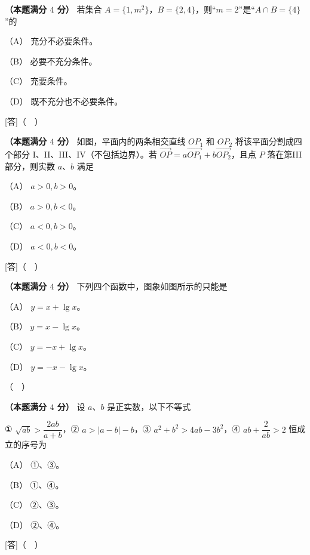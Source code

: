 \begin{question}
\textbf{（本题满分 $4$ 分）} 若集合 $A=\{1,m^2\}$，$B=\{2,4\}$，则“$m=2$”是“$A\cap B=\{4\}$”的

（A） 充分不必要条件。

（B） 必要不充分条件。

（C） 充要条件。

（D） 既不充分也不必要条件。

[答]（　）

\Needspace{0.4\textheight}
\end{question}
\begin{question}
\textbf{（本题满分 $4$ 分）} 如图，平面内的两条相交直线 $OP_1$ 和 $OP_2$ 将该平面分割成四个部分 I、II、III、IV（不包括边界）。若 $\overrightarrow{OP}=a\overrightarrow{OP_1}+b\overrightarrow{OP_2}$，且点 $P$ 落在第III部分，则实数 $a$、$b$ 满足
\nopagebreak[4]
\begin{center}\end{center}
\nopagebreak[4]
（A） $a>0,b>0$。

（B） $a>0,b<0$。

（C） $a<0,b>0$。

（D） $a<0,b<0$。

[答]（　）

\Needspace{0.4\textheight}
\end{question}
\begin{question}
\textbf{（本题满分 $4$ 分）} 下列四个函数中，图象如图所示的只能是

（A） $y=x+\lg x$。

（B） $y=x-\lg x$。

（C） $y=-x+\lg x$。

（D） $y=-x-\lg x$。
\nopagebreak[4]
\begin{center}\end{center}
\nopagebreak[4]
[答]（　）

\end{question}
\begin{question}
\textbf{（本题满分 $4$ 分）} 设 $a$、$b$ 是正实数，以下不等式

① $\sqrt{ab}>\dfrac{2ab}{a+b}$，② $a>|a-b|-b$，③ $a^2+b^2>4ab-3b^2$，④ $ab+\dfrac2{ab}>2$ 恒成立的序号为

（A） ①、③。

（B） ①、④。

（C） ②、③。

（D） ②、④。

[答]（　）

\end{question}

